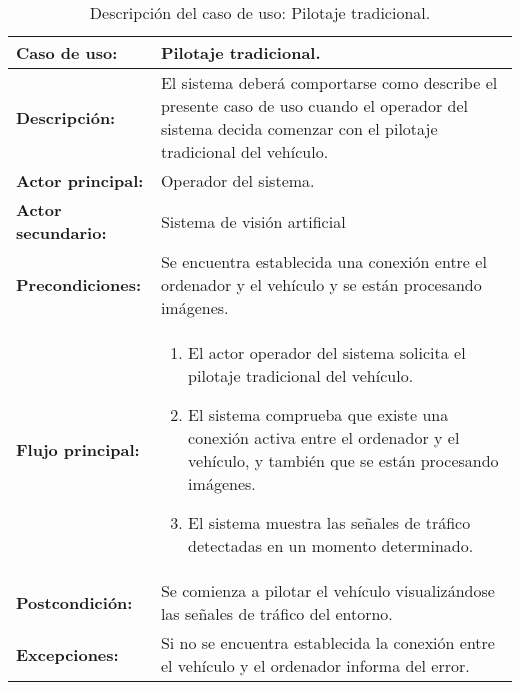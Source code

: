 \begin{table}[H]
  \begin{center}
    \begin{tabular}{|p{3.5cm}|p{10cm}|}
      \hline
      {\textbf{Caso de uso:}} & { Pilotaje tradicional.} \\
      \hline
      {\textbf{Descripción:}} & {El sistema deberá comportarse como describe el presente caso de uso cuando el operador del sistema decida comenzar con el pilotaje tradicional del vehículo.} \\
     \hline
      {\textbf{Actor principal:}} & { Operador del sistema.} \\
      \hline
      {\textbf{Actor secundario:}} & {Sistema de visión artificial}\\
      \hline
      {\textbf{Precondiciones:}} & { Se encuentra establecida una conexión entre el ordenador y el vehículo y se están procesando imágenes.} \\
     \hline     
     {\textbf{Flujo principal:}} & { 
       \begin{enumerate}
       \item El actor operador del sistema solicita el pilotaje tradicional del vehículo.
       \item El sistema comprueba que existe una conexión activa entre el ordenador y el vehículo, y también que se están
         procesando imágenes.
       \item El sistema muestra las señales de tráfico detectadas en un momento determinado.
       \end{enumerate}
     } \\
     \hline
     {\textbf{Postcondición:}} & {Se comienza a pilotar el vehículo visualizándose las señales de tráfico del entorno.}\\
     \hline
     {\textbf{Excepciones:}} & {Si no se encuentra establecida la conexión entre el vehículo y el ordenador informa del error.}\\        
     \hline
    \end{tabular}
  \end{center}
\caption{Descripción del caso de uso: Pilotaje tradicional.}
\end{table}


